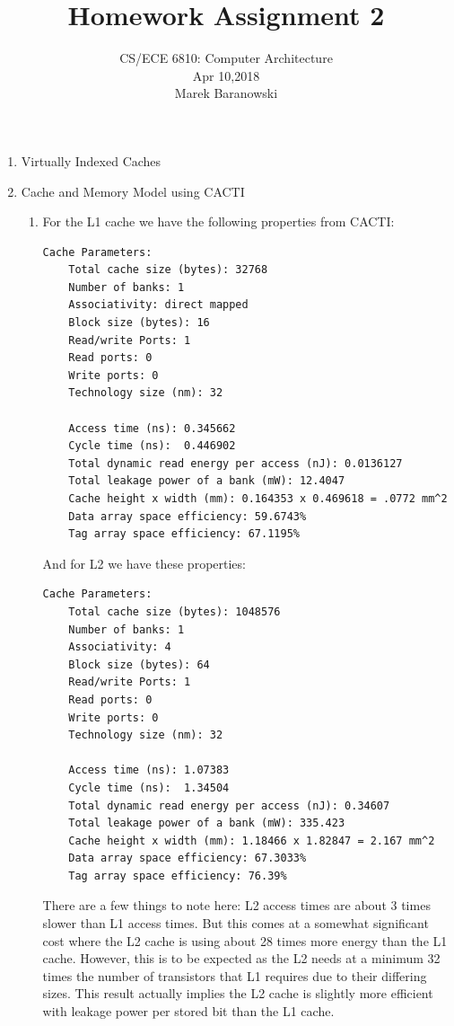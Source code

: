 \documentclass[a4paper, 11pt]{exam}
\title{Homework Assignment 2}
\subtitle{CS/ECE 6810: Computer Architecture \\
Apr 10,2018\\
Marek Baranowski}
\begin{document}
\maketitle
\begin{enumerate}
\item Virtually Indexed Caches

\item Cache and Memory Model using CACTI

\begin{enumerate}
\item For the L1 cache we have the following properties from CACTI:
\begin{verbatim}
Cache Parameters:
    Total cache size (bytes): 32768
    Number of banks: 1
    Associativity: direct mapped
    Block size (bytes): 16
    Read/write Ports: 1
    Read ports: 0
    Write ports: 0
    Technology size (nm): 32

    Access time (ns): 0.345662
    Cycle time (ns):  0.446902
    Total dynamic read energy per access (nJ): 0.0136127
    Total leakage power of a bank (mW): 12.4047
    Cache height x width (mm): 0.164353 x 0.469618 = .0772 mm^2
    Data array space efficiency: 59.6743%
    Tag array space efficiency: 67.1195%
\end{verbatim}
And for L2 we have these properties:
\begin{verbatim}
Cache Parameters:
    Total cache size (bytes): 1048576
    Number of banks: 1
    Associativity: 4
    Block size (bytes): 64
    Read/write Ports: 1
    Read ports: 0
    Write ports: 0
    Technology size (nm): 32

    Access time (ns): 1.07383
    Cycle time (ns):  1.34504
    Total dynamic read energy per access (nJ): 0.34607
    Total leakage power of a bank (mW): 335.423
    Cache height x width (mm): 1.18466 x 1.82847 = 2.167 mm^2
    Data array space efficiency: 67.3033%
    Tag array space efficiency: 76.39%
\end{verbatim}
There are a few things to note here: L2 access times are about 3 times slower
than L1 access times. But this comes at a somewhat significant cost where the
L2 cache is using about 28 times more energy than the L1 cache. However, this is
to be expected as the L2 needs at a minimum 32 times the number of
transistors that L1 requires due to their differing sizes. This result actually
implies the L2 cache is slightly more efficient with leakage power per stored
bit than the L1 cache.


\end{enumerate}
\end{enumerate}
\end{document}
